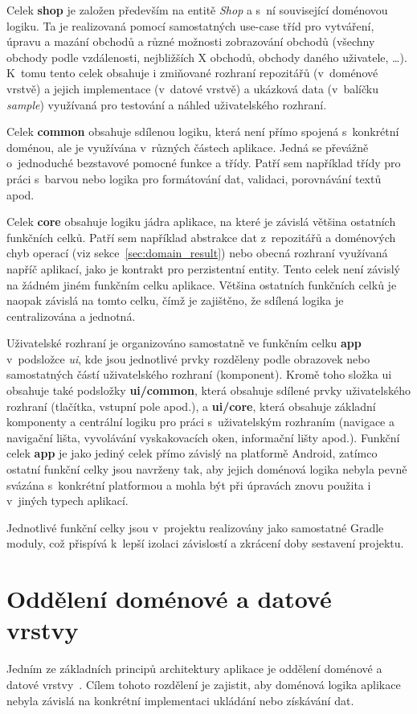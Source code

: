 Celek \textbf{shop} je založen především na entitě \textit{Shop} a s~ní související doménovou logiku.
Ta je realizovaná pomocí samostatných use-case tříd pro vytváření, úpravu a mazání obchodů a různé možnosti zobrazování obchodů (všechny obchody podle vzdálenosti, nejbližších X obchodů, obchody daného uživatele, \ldots).
K~tomu tento celek obsahuje i zmiňované rozhraní repozitářů (v~doménové vrstvě) a jejich implementace (v~datové vrstvě) a ukázková data (v~balíčku \textit{sample}) využívaná pro testování a náhled uživatelského rozhraní.

Celek \textbf{common} obsahuje sdílenou logiku, která není přímo spojená s~konkrétní doménou, ale je využívána v~různých částech aplikace.
Jedná se převážně o~jednoduché bezstavové pomocné funkce a třídy.
Patří sem například třídy pro práci s~barvou nebo logika pro formátování dat, validaci, porovnávání textů apod.

Celek \textbf{core} obsahuje logiku jádra aplikace, na které je závislá většina ostatních funkčních celků.
Patří sem například abstrakce dat z~repozitářů a doménových chyb operací (viz sekce~\ref{sec:domain_result}) nebo obecná rozhraní využívaná napříč aplikací, jako je kontrakt pro perzistentní entity.
Tento celek není závislý na žádném jiném funkčním celku aplikace.
Většina ostatních funkčních celků je naopak závislá na tomto celku, čímž je zajištěno, že sdílená logika je centralizována a jednotná.

Uživatelské rozhraní je organizováno samostatně ve funkčním celku \textbf{app} v~podsložce \textit{ui}, kde jsou jednotlivé prvky rozděleny podle obrazovek nebo samostatných částí uživatelského rozhraní (komponent).
Kromě toho složka ui obsahuje také podsložky \textbf{ui/common}, která obsahuje sdílené prvky uživatelského rozhraní (tlačítka, vstupní pole apod.), a \textbf{ui/core}, která obsahuje základní komponenty a centrální logiku pro práci s~uživatelským rozhraním (navigace a navigační lišta, vyvolávání vyskakovacích oken, informační lišty apod.).
Funkční celek \textbf{app} je jako jediný celek přímo závislý na platformě Android, zatímco ostatní funkční celky jsou navrženy tak, aby jejich doménová logika nebyla pevně svázána s~konkrétní platformou a mohla být při úpravách znovu použita i v~jiných typech aplikací.

Jednotlivé funkční celky jsou v~projektu realizovány jako samostatné Gradle moduly, což přispívá k~lepší izolaci závislostí a zkrácení doby sestavení projektu.


\section{Oddělení doménové a datové vrstvy}\label{sec:oddeleni-domenove-a-datove-vrstvy}
Jedním ze základních principů architektury aplikace je oddělení doménové a datové vrstvy~\parencite{domain_data_layer_separation, evans_ddd, martin_clean_architecture}.
Cílem tohoto rozdělení je zajistit, aby doménová logika aplikace nebyla závislá na konkrétní implementaci ukládání nebo získávání dat.

